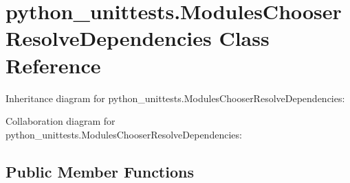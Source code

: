 \hypertarget{classpython__unittests_1_1_modules_chooser_resolve_dependencies}{}\section{python\+\_\+unittests.\+Modules\+Chooser\+Resolve\+Dependencies Class Reference}
\label{classpython__unittests_1_1_modules_chooser_resolve_dependencies}


Inheritance diagram for python\+\_\+unittests.\+Modules\+Chooser\+Resolve\+Dependencies\+:


Collaboration diagram for python\+\_\+unittests.\+Modules\+Chooser\+Resolve\+Dependencies\+:
\subsection*{Public Member Functions}
